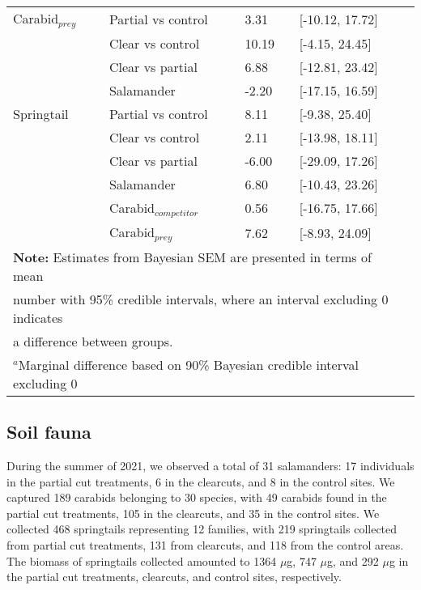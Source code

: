 \begin{table}[ht]
\begin{tabular}{lllll}
      Carabid$_{prey}$    & Partial vs control & \hspace{1mm}3.31 & [-10.12, 17.72] \\
                          & Clear vs control  & \hspace{1mm}10.19 & [-4.15, 24.45] \\ 
                          & Clear vs partial  & \hspace{1mm}6.88 & [-12.81, 23.42] \\  
                          & Salamander        & -2.20 & [-17.15, 16.59] \\  
      Springtail         & Partial vs control & \hspace{1mm}8.11 & [-9.38, 25.40] \\
                          & Clear vs control  & \hspace{1mm}2.11 & [-13.98, 18.11] \\ 
                          & Clear vs partial  & -6.00 & [-29.09, 17.26] \\  
                          & Salamander        & \hspace{1mm}6.80 & [-10.43, 23.26] \\ 
                          & Carabid$_{competitor}$      & \hspace{1mm}0.56 & [-16.75, 17.66] \\ 
                          & Carabid$_{prey}$      & \hspace{1mm}7.62 & [-8.93, 24.09] \\ 
      \hline
      \multicolumn{4}{l}{\textbf{Note:} Estimates from Bayesian SEM are presented in terms of mean} \\
      \multicolumn{4}{l}{number with 95\% credible intervals, where an interval excluding 0 indicates} \\
      \multicolumn{4}{l}{a difference between groups.} \\
      \multicolumn{4}{l}{$^{a}$Marginal difference based on 90\% Bayesian credible interval excluding 0}
  \end{tabular}
\end{table}


\subsection*{Soil fauna}
\label{subsec:taxa}

During the summer of 2021, we observed a total of 31 salamanders: 17 individuals in the partial cut treatments, 6 in the clearcuts, and 8 in the control sites. We captured 189 carabids belonging to 30 species, with 49 carabids found in the partial cut treatments, 105 in the clearcuts, and 35 in the control sites. We collected 468 springtails representing 12 families, with 219 springtails collected from partial cut treatments, 131 from clearcuts, and 118 from the control areas. The biomass of springtails collected amounted to 1364 $\mu$g, 747 $\mu$g, and 292 $\mu$g in the partial cut treatments, clearcuts, and control sites, respectively.

